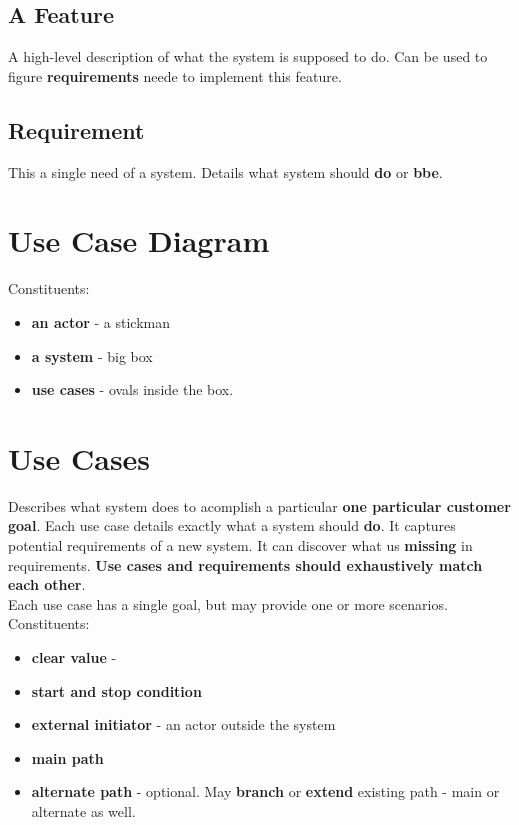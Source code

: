 \documentclass{report}
\begin{document}
\subsection{A Feature}
A high-level description of what the system is supposed to do. Can be used to figure
 \textbf{requirements} neede to implement this feature.

\subsection{Requirement}
This a single need of a system. Details what system should \textbf{do} or
\textbf{bbe}.


\section{Use Case Diagram}
Constituents:
\begin{itemize}
  \item \textbf{an actor} - a stickman
  \item \textbf{a system} - big box
  \item \textbf{use cases} - ovals inside the box. 
\end{itemize}


\section{Use Cases}
Describes what system does to acomplish a particular \textbf{one particular 
customer goal}. Each use case details exactly what a system should \textbf{do}.
It captures potential requirements of a new system. It can discover what us
\textbf{missing} in requirements. \textbf{Use cases and requirements should exhaustively match each other}.\\
Each use case has a single goal, but may provide one or more scenarios. Constituents:
\begin{itemize}
  \item \textbf{clear value} - 
  \item \textbf{start and stop condition}
  \item \textbf{external initiator} - an actor outside the system
  \item \textbf{main path}
  \item \textbf{alternate path} - optional. May \textbf{branch} or \textbf{extend} 
  existing path - main or alternate as well.
\end{itemize}
\end{document}
